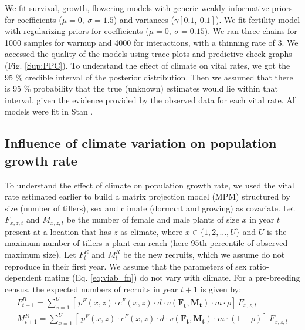 \documentclass[12pt]{article}
\begin{document}
We fit survival, growth, flowering models with generic weakly informative priors for coefficients ($\mu = 0,\ \sigma = 1.5$) and variances ($\gamma [0.1,\ 0.1]$).
{\color{blue}We fit fertility model with regularizing priors for coefficients ($\mu = 0,\ \sigma = 0.15$).} 
We ran three chains for 1000 samples for warmup and 4000 for interactions, with a thinning rate of 3.
We accessed the quality of the models using trace plots and predictive check graphs \citep{piironen2017comparison} (Fig. \ref{Sup:PPC}).
To understand the effect of climate on vital rates, we got the 95 \% credible interval of the posterior distribution.  
Then we assumed that there is 95 \% probability that the true (unknown) estimates would lie within that interval, given the evidence provided by the observed data for each vital rate.
All models were fit in Stan \citep{rstan}. 

\subsection*{Influence of climate variation on population growth rate}
To understand the effect of climate on population growth rate, we used the vital rate estimated earlier to build a matrix projection model (MPM) structured by size (number of tillers), sex and climate (dormant and growing) as covariate.  
Let $F_{x,z,t}$ and $M_{x,z,t}$ be the number of female and male plants of size $x$ in year $t$ present at a location that has $z$ as climate, where $x \in \{1,2,...,U\}$ and $U$ is the maximum number of tillers a plant can reach (here 95th percentile of observed maximum size).
Let $F^{R}_{t}$ and $M^{R}_{t}$ be the new recruits, which we assume do not reproduce in their first year.
We assume that the parameters of sex ratio-dependent mating (Eq. \ref{eq:viab_fn}) do not vary with climate.  
For a pre-breeding census, the expected numbers of recruits in year $t+1$ is given by:
\begin{align}\label{eq:recruits}
F^{R}_{t+1} = \sum_{x=1}^{U} 	[ \, p^{F}(x,z) \cdot c^{F}(x,z) \cdot d \cdot v(\mathbf{F_{t}},\mathbf{M_{t}}) \cdot m \cdot \rho 	] \, F_{x,z,t}
\\
M^{R}_{t+1} = \sum_{x=1}^{U} 	[ \, p^{F}(x,z) \cdot c^{F}(x,z) \cdot d \cdot v(\mathbf{F_{t}},\mathbf{M_{t}}) \cdot m \cdot (1-\rho) 	] \, F_{x,z,t}
\end{align}
\end{document}
